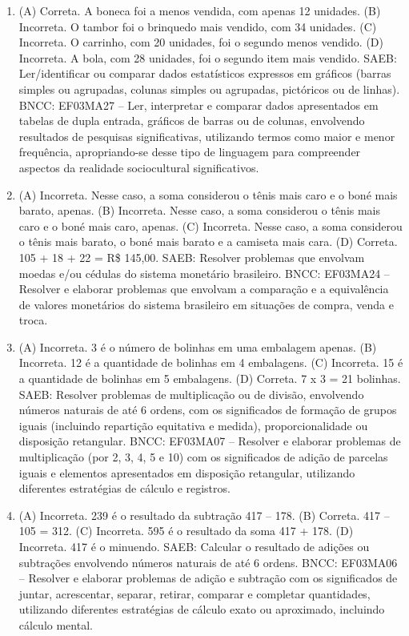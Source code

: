 \begin{enumerate}
\item
(A) Correta. A boneca foi a menos vendida, com apenas 12 unidades.
(B) Incorreta. O tambor foi o brinquedo mais vendido, com 34 unidades.
(C) Incorreta. O carrinho, com 20 unidades, foi o segundo menos vendido.
(D) Incorreta. A bola, com 28 unidades, foi o segundo item mais vendido.
SAEB: Ler/identificar ou comparar dados estatísticos
expressos em gráficos (barras simples ou agrupadas, colunas simples ou agrupadas, pictóricos ou de linhas).
BNCC: EF03MA27 -- Ler, interpretar e comparar dados apresentados em tabelas de dupla entrada,
gráficos de barras ou de colunas, envolvendo resultados de pesquisas significativas, utilizando
termos como maior e menor frequência, apropriando-se desse tipo de linguagem para
compreender aspectos da realidade sociocultural significativos.

\item
(A) Incorreta. Nesse caso, a soma considerou o tênis mais caro e o boné mais barato, apenas.
(B) Incorreta. Nesse caso, a soma considerou o tênis mais caro e o boné mais caro, apenas.
(C) Incorreta. Nesse caso, a soma considerou o tênis mais barato, o boné mais barato e a camiseta mais cara.
(D) Correta. 105 + 18 + 22 = R\$ 145,00.
SAEB: Resolver problemas que envolvam moedas e/ou cédulas do sistema monetário brasileiro.
BNCC: EF03MA24 -- Resolver e elaborar problemas que envolvam a comparação e a equivalência de
valores monetários do sistema brasileiro em situações de compra, venda e troca.

\item
(A) Incorreta. 3 é o número de bolinhas em uma embalagem apenas.
(B) Incorreta. 12 é a quantidade de bolinhas em 4 embalagens.
(C) Incorreta. 15 é a quantidade de bolinhas em 5 embalagens.
(D) Correta. 7 x 3 = 21 bolinhas.
SAEB: Resolver problemas de multiplicação ou de divisão, envolvendo números naturais de até 6 ordens, com os significados de formação de grupos iguais (incluindo repartição equitativa e medida), proporcionalidade ou disposição retangular.
BNCC: EF03MA07 – Resolver e elaborar problemas de multiplicação (por 2, 3, 4, 5 e 10) com os
significados de adição de parcelas iguais e elementos apresentados em disposição retangular,
utilizando diferentes estratégias de cálculo e registros.

\item
(A) Incorreta. 239 é o resultado da subtração 417 -- 178.
(B) Correta. 417 -- 105 = 312.
(C) Incorreta. 595 é o resultado da soma 417 + 178.
(D) Incorreta. 417 é o minuendo.
SAEB: Calcular o resultado de adições ou subtrações
envolvendo números naturais de até 6 ordens.
BNCC: EF03MA06 – Resolver e elaborar problemas de adição e subtração com os significados de
juntar, acrescentar, separar, retirar, comparar e completar quantidades, utilizando diferentes
estratégias de cálculo exato ou aproximado, incluindo cálculo mental.
\end{enumerate}